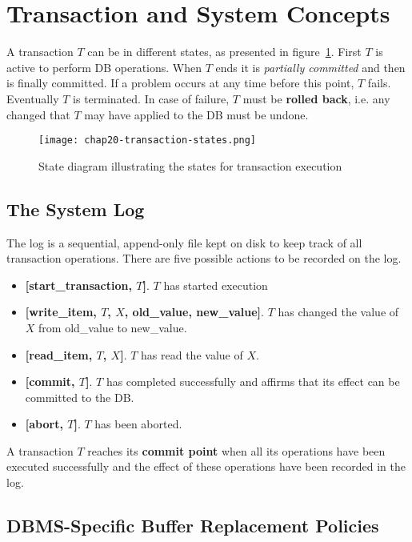 \section{Transaction and System Concepts}
A transaction $T$ can be in different states, as presented in figure~\ref{fig:chap20-transaction-states}. First $T$ is active to perform DB operations. When $T$ ends it is \textit{partially committed} and then is finally committed. If a problem occurs at any time before this point, $T$ fails. Eventually $T$ is terminated. In case of failure, $T$ must be \textbf{rolled back}, i.e. any changed that $T$ may have applied to the DB must be undone.

\begin{figure}[h!]
    \centering
    \texttt{[image: chap20-transaction-states.png]}
    \caption{State diagram illustrating the states for transaction execution}
    \label{fig:chap20-transaction-states}
\end{figure}

\subsection{The System Log}
The log is a sequential, append-only file kept on disk to keep track of all transaction operations. There are five possible actions to be recorded on the log.

\begin{itemize}
    \item \textbf{[start\_transaction, $T$]}. $T$ has started execution
    \item \textbf{[write\_item, $T$, $X$, old\_value, new\_value]}. $T$ has changed the value of $X$ from old\_value to new\_value.
    \item \textbf{[read\_item, $T$, $X$]}. $T$ has read the value of $X$.
    \item \textbf{[commit, $T$]}. $T$ has completed successfully and affirms that its effect can be committed to the DB.
    \item \textbf{[abort, $T$]}. $T$ has been aborted.
\end{itemize}

A transaction $T$ reaches its \textbf{commit point} when all its operations have been executed successfully and the effect of these operations have been recorded in the log.

\subsection{DBMS-Specific Buffer Replacement Policies}

